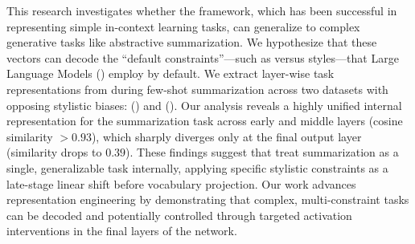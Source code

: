 This research investigates whether the \newterm{\fv} framework, which has been successful in representing simple in-context learning tasks, can generalize to complex generative tasks like abstractive summarization. We hypothesize that these vectors can decode the ``default constraints''---such as \extractive versus \abstractive styles---that Large Language Models (\fvsabbr) employ by default. We extract layer-wise task representations from \gpttwo during few-shot summarization across two datasets with opposing stylistic biases: \cnndm (\extractive) and \xsum (\abstractive). Our analysis reveals a highly unified internal representation for the summarization task across early and middle layers (cosine similarity $> 0.93$), which sharply diverges only at the final output layer (similarity drops to $0.39$). These findings suggest that \fvsabbr treat summarization as a single, generalizable task internally, applying specific stylistic constraints as a late-stage linear shift before vocabulary projection. Our work advances representation engineering by demonstrating that complex, multi-constraint tasks can be decoded and potentially controlled through targeted activation interventions in the final layers of the network.
